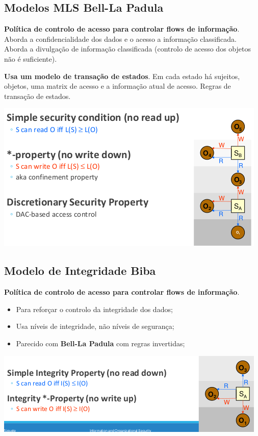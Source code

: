 \documentclass{article}
\begin{document}
\pagebreak

\subsection{Modelos MLS Bell-La Padula}

\begin{flushleft}
  \textbf{Política de controlo de acesso para controlar flows de informação}.
  Aborda a confidencialidade dos dados e o acesso a informação classificada. Aborda
  a divulgação de informação classificada (controlo de acesso dos objetos não é suficiente).

  \vspace{2mm}

  \textbf{Usa um modelo de transação de estados}. Em cada estado há sujeitos, objetos,
  uma matrix de acesso e a informação atual de acesso. Regras de transação de estados.
\end{flushleft}
\begin{center}
  \includegraphics[scale=0.4]{25}
\end{center}

\subsection{Modelo de Integridade Biba}

\begin{flushleft}
  \textbf{Política de controlo de acesso para controlar flows de informação}.
  \begin{itemize}
    \item Para reforçar o controlo da integridade dos dados;
    \item Usa níveis de integridade, não níveis de segurança;
    \item Parecido com \textbf{Bell-La Padula} com regras invertidas;
  \end{itemize}

  \begin{center}
    \includegraphics[scale=0.4]{26}
  \end{center}
\end{flushleft}
\end{document}
